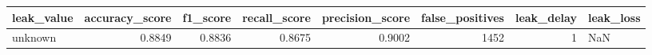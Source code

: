 \begin{tabular}{lrrrrrrl}
\toprule
leak\_value & accuracy\_score & f1\_score & recall\_score & precision\_score & false\_positives & leak\_delay & leak\_loss \\
\midrule
unknown & 0.8849 & 0.8836 & 0.8675 & 0.9002 & 1452 & 1 & NaN \\
\bottomrule
\end{tabular}

